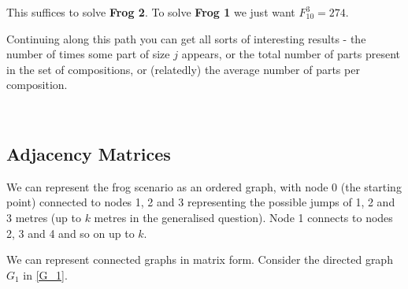 \documentclass[hidelinks]{article}
\begin{document}
This suffices to solve \textbf{Frog 2}. To solve \textbf{Frog 1} we just want $F_{10}^3=274$.

Continuing along this path you can get all sorts of interesting results - the number of times some part of size $j$ appears, or the total number of parts present in the set of compositions, or (relatedly) the average number of parts per composition.  


~\\[8pt]
\subsection{Adjacency Matrices}

We can represent the frog scenario as an ordered graph, with node 0 (the starting point) connected to nodes 1, 2 and 3 representing the possible jumps of 1, 2 and 3 metres (up to $k$ metres in the generalised question).  Node 1 connects to nodes 2, 3 and 4 and so on up to $k$. 

We can represent connected graphs in matrix form.  Consider the directed graph $G_1$ in \ref{G_1}.
\end{document}
